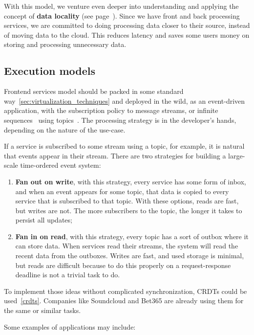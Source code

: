 With this model, we venture even deeper into understanding and applying the concept of \textbf{data locality} (see page~\pageref{ds:data_locality}). Since we have front and back processing services, we are committed to doing processing data closer to their source, instead of moving data to the cloud. This reduces latency and saves some users money on storing and processing unnecessary data.
%
%
\subsection{Execution models}\label{sec:execution_models}
%
Frontend services model should be packed in some standard way~\ref{sec:virtualization_techniques} and deployed in the wild, as an event-driven application, with the subscription policy to message streams, or infinite sequences~\cite{Rutten03} using topics~\cite{inproceedingsBeck}. The processing strategy is in the developer's hands, depending on the nature of the use-case. 

If a service is subscribed to some stream using a topic, for example, it is natural that events appear in their stream. There are two strategies for building a large-scale time-ordered event system:

\begin{enumerate}[start=1,label={(\bfseries \arabic*)}]
	\item \textbf{Fan out on write}, with this strategy, every service has some form of inbox, and when an event appears for some topic, that data is copied to every service that is subscribed to that topic. With these options, reads are fast, but writes are not. The more subscribers to the topic, the longer it takes to persist all updates; 
	\item \textbf{Fan in on read}, with this strategy, every topic has a sort of outbox where it can store data. When services read their streams, the system will read the recent data from the outboxes. Writes are fast, and used storage is minimal, but reads are difficult because to do this properly on a request-response deadline is not a trivial task to do.
\end{enumerate}

\noindent 
To implement those ideas without complicated synchronization, CRDTs could be used~\ref{crdts}. Companies like Soundcloud and Bet365 are already using them for the same or similar tasks.

Some examples of applications may include:


